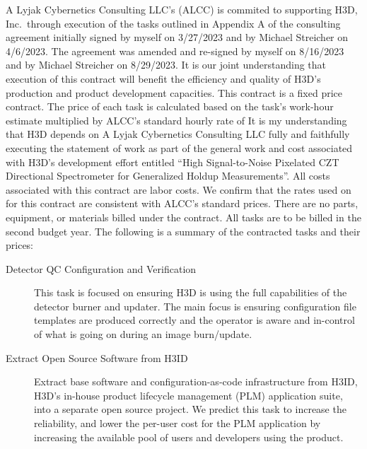 \documentclass[8pt, letterpaper]{awesome-cv} %
\begin{document}
\makecvheader %

\makelettertitle %


\begin{cvletter}
  A Lyjak Cybernetics Consulting LLC's (ALCC) is commited to supporting H3D,
  Inc.\ through execution of the tasks outlined in Appendix A of the consulting agreement initially
  signed by myself on 3/27/2023 and by Michael Streicher on 4/6/2023. The agreement was amended and
  re-signed by myself on 8/16/2023 and by Michael Streicher on 8/29/2023. It is our joint
  understanding that execution of this contract will benefit the efficiency and quality of H3D's
  production and product development capacities. This contract is a fixed price contract. The price
  of each task is calculated based on the task's work-hour estimate multiplied by ALCC's standard
  hourly rate of  It is my understanding that H3D depends on A Lyjak
  Cybernetics Consulting LLC fully and faithfully executing the statement of work as part of the
  general work and cost associated with H3D's development effort entitled ``High Signal-to-Noise
  Pixelated CZT Directional Spectrometer for Generalized Holdup Measurements''. All costs associated
  with this contract are labor costs. We confirm that the rates used on for this contract are
  consistent with ALCC's standard prices. There are no parts, equipment, or materials billed under
  the contract. All tasks are to be billed in the second budget year. The following is a summary of
  the contracted tasks and their prices:

  \begin{description}
    \item[Detector QC Configuration and Verification] This task is focused on ensuring H3D is using
      the full capabilities of the detector burner and updater. The main focus is ensuring
      configuration file templates are produced correctly and the operator is aware and in-control
      of what is going on during an image burn/update. 

    \item[Extract Open Source Software from H3ID] Extract base software and configuration-as-code
      infrastructure from H3ID, H3D's in-house product lifecycle management (PLM) application suite,
      into a separate open source project. We predict this task to increase the reliability, and
      lower the per-user cost for the PLM application by increasing the available pool of users and
      developers using the product. 


\end{description}
\end{cvletter}
\end{document}
